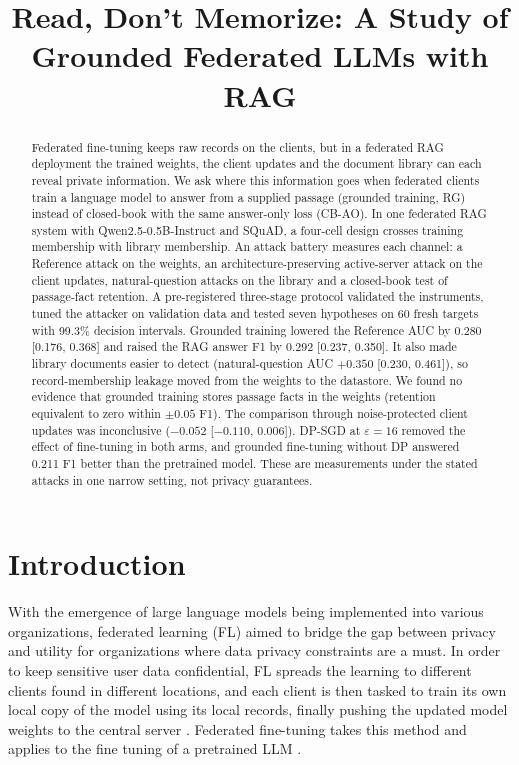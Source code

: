 \documentclass[11pt]{article}
\title{Read, Don’t Memorize: A Study of Grounded Federated LLMs with
RAG}
\author{}
\date{}
\begin{document}
\maketitle

\begin{abstract}
Federated fine-tuning keeps raw records on the clients, but in a federated RAG deployment the trained weights, the client updates and the document library can each reveal private information. We ask where this information goes when federated clients train a language model to answer from a supplied passage (grounded training, RG) instead of closed-book with the same answer-only loss (CB-AO). In one federated RAG system with Qwen2.5-0.5B-Instruct and SQuAD, a four-cell design crosses training membership with library membership. An attack battery measures each channel: a Reference attack on the weights, an architecture-preserving active-server attack on the client updates, natural-question attacks on the library and a closed-book test of passage-fact retention. A pre-registered three-stage protocol validated the instruments, tuned the attacker on validation data and tested seven hypotheses on 60 fresh targets with 99.3\% decision intervals. Grounded training lowered the Reference AUC by 0.280 [0.176, 0.368] and raised the RAG answer F1 by 0.292 [0.237, 0.350]. It also made library documents easier to detect (natural-question AUC $+0.350$ [0.230, 0.461]), so record-membership leakage moved from the weights to the datastore. We found no evidence that grounded training stores passage facts in the weights (retention equivalent to zero within $\pm0.05$ F1). The comparison through noise-protected client updates was inconclusive ($-0.052$ [$-0.110$, 0.006]). DP-SGD at $\varepsilon=16$ removed the effect of fine-tuning in both arms, and grounded fine-tuning without DP answered 0.211 F1 better than the pretrained model. These are measurements under the stated attacks in one narrow setting, not privacy guarantees.
\end{abstract}

\section{Introduction}

With the emergence of large language models being implemented into various organizations, federated learning (FL) aimed to bridge the gap between privacy and utility for organizations where data privacy constraints are a must. In order to keep sensitive user data confidential, FL spreads the learning to different clients found in different locations, and each client is then tasked to train its own local copy of the model using its local records, finally pushing the updated model weights to the central server \citep{mcmahan2017communication}. Federated fine-tuning takes this method and applies to the fine tuning of a pretrained LLM \citep{yao2026federated,yan2025federated,wu2026survey,cheng2025toward}.
\end{document}
